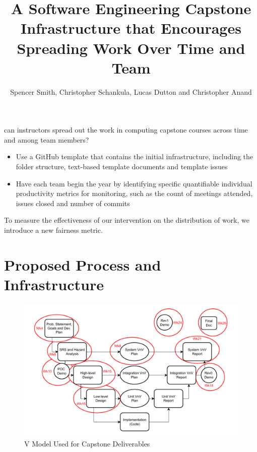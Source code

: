 \documentclass[poster, a0, plainboxedsections]{sciposter}
\title{A Software Engineering Capstone Infrastructure that Encourages Spreading
Work Over Time and Team}
\author{Spencer Smith, Christopher Schankula, Lucas Dutton and Christopher Anand}
\institute{Computing and Software Department, McMaster University}
\begin{document}

\maketitle

\setlength{\columnseprule}{0pt}
\begin{multicols}{2}

 can instructors spread out the work in computing capstone
courses across time and among team members? 
\begin{itemize}
\item Use a GitHub template that contains the initial infrastructure, including
the folder structure, text-based template documents and template issues
\item Have each team begin the year by identifying specific quantifiable
individual productivity metrics for monitoring, such as the count of meetings
attended, issues closed and number of commits
\end{itemize}

\noindent To measure the effectiveness of our intervention on the distribution of work, we
introduce a new fairness metric.

\section{Proposed Process and Infrastructure} \label{SecPropInfrastruc}

\begin{figure}[!h]
\includegraphics[width=1.0\linewidth]{../figures/CourseStructure.drawio.pdf}
\caption{\label{Fig_VModel} V Model Used for Capstone Deliverables}
\label{FigStructure}
\end{figure}


\end{multicols}
\end{document}
